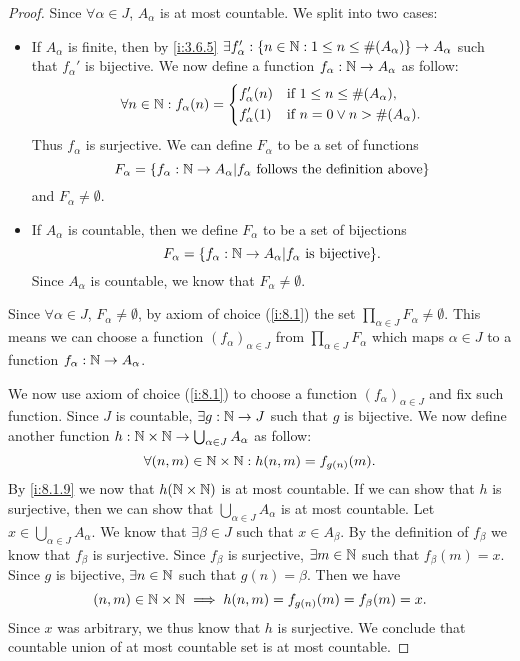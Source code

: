 \begin{proof}
  Since \(\forall \alpha \in J\), \(A_{\alpha}\) is at most countable.
  We split into two cases:
  \begin{itemize}
    \item If \(A_{\alpha}\) is finite, then by \cref{i:3.6.5} \(\exists f_{\alpha}' : \left\lbrace n \in \mathbb{N} : 1 \leq n \leq \#(A_{\alpha})\right\rbrace \to A_{\alpha}\) such that \(f_{\alpha}'\) is bijective.
          We now define a function \(f_{\alpha} : \mathbb{N} \to A_{\alpha}\) as follow:
          \[
            \forall n \in \mathbb{N} : f_{\alpha}(n) = \begin{dcases}
              f_{\alpha}'(n) & \text{if } 1 \leq n \leq \#(A_{\alpha}),  \\
              f_{\alpha}'(1) & \text{if } n = 0 \lor n > \#(A_{\alpha}).
            \end{dcases}
          \]
          Thus \(f_{\alpha}\) is surjective.
          We can define \(F_{\alpha}\) to be a set of functions
          \[
            F_{\alpha} = \left\lbrace f_{\alpha} : \mathbb{N} \to A_{\alpha} | f_{\alpha} \text{ follows the definition above}\right\rbrace
          \]
          and \(F_{\alpha} \neq \emptyset\).
    \item If \(A_{\alpha}\) is countable, then we define \(F_{\alpha}\) to be a set of bijections
          \[
            F_{\alpha} = \set{f_{\alpha} : \N \to A_{\alpha} | f_{\alpha} \text{ is bijective}}.
          \]
          Since \(A_{\alpha}\) is countable, we know that \(F_{\alpha} \neq \emptyset\).
  \end{itemize}
  Since \(\forall \alpha \in J\), \(F_{\alpha} \neq \emptyset\), by axiom of choice (\cref{i:8.1}) the set \(\prod_{\alpha \in J} F_{\alpha} \neq \emptyset\).
  This means we can choose a function \((f_{\alpha})_{\alpha \in J}\) from \(\prod_{\alpha \in J} F_{\alpha}\) which maps \(\alpha \in J\) to a function \(f_{\alpha} : \mathbb{N} \to A_{\alpha}\).

  We now use axiom of choice (\cref{i:8.1}) to choose a function \((f_{\alpha})_{\alpha \in J}\) and fix such function.
  Since \(J\) is countable, \(\exists g : \mathbb{N} \to J\) such that \(g\) is bijective.
  We now define another function \(h : \mathbb{N} \times \mathbb{N} \to \bigcup_{\alpha \in J} A_{\alpha}\) as follow:
  \[
    \forall (n, m) \in \mathbb{N} \times \mathbb{N} : h(n, m) = f_{g(n)}(m).
  \]
  By \cref{i:8.1.9} we now that \(h(\mathbb{N} \times \mathbb{N})\) is at most countable.
  If we can show that \(h\) is surjective, then we can show that \(\bigcup_{\alpha \in J} A_{\alpha}\) is at most countable.
  Let \(x \in \bigcup_{\alpha \in J} A_{\alpha}\).
  We know that \(\exists \beta \in J\) such that \(x \in A_{\beta}\).
  By the definition of \(f_{\beta}\) we know that \(f_{\beta}\) is surjective.
  Since \(f_{\beta}\) is surjective, \(\exists m \in \mathbb{N}\) such that \(f_{\beta}(m) = x\).
  Since \(g\) is bijective, \(\exists n \in \mathbb{N}\) such that \(g(n) = \beta\).
  Then we have
  \[
    (n, m) \in \mathbb{N} \times \mathbb{N} \implies h(n, m) = f_{g(n)}(m) = f_{\beta}(m) = x.
  \]
  Since \(x\) was arbitrary, we thus know that \(h\) is surjective.
  We conclude that countable union of at most countable set is at most countable.


\end{proof}
